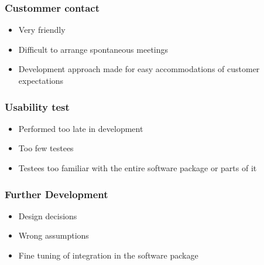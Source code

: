 		\begin{frame}
			\frametitle{Custommer contact}
			\begin{itemize}
				\item Very friendly
				\item Difficult to arrange spontaneous meetings
				\item Development approach made for easy accommodations of customer expectations
			\end{itemize}
		\end{frame}
		
		\begin{frame}
			\frametitle{Usability test}
			\begin{itemize}
				\item Performed too late in development
				\item Too few testees
				\item Testees too familiar with the entire software package or parts of it
			\end{itemize}
		\end{frame}
		
		\begin{frame}
			\frametitle{Further Development}
			\begin{itemize}
				\item Design decisions
				\item Wrong assumptions
				\item Fine tuning of integration in the software package
			\end{itemize}
		\end{frame}